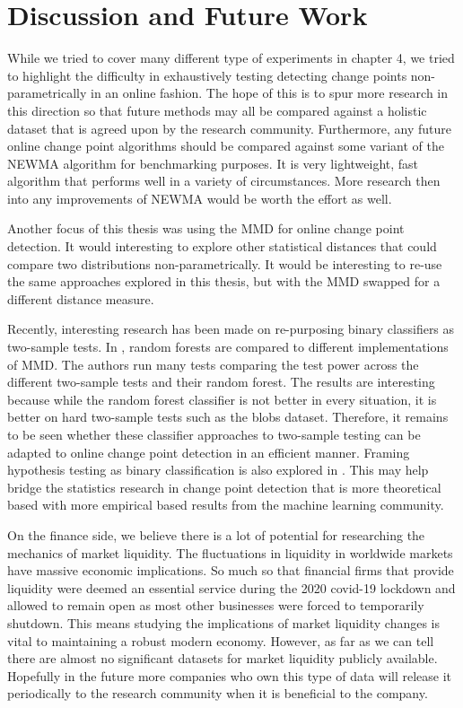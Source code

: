 \section{Discussion and Future Work}

While we tried to cover many different type of experiments in chapter 4, we tried to highlight the difficulty in exhaustively testing detecting change points non-parametrically in an online fashion. The hope of this is to spur more research in this direction so that future methods may all be compared against a holistic dataset that is agreed upon by the research community. Furthermore, any future online change point algorithms should be compared against some variant of the NEWMA algorithm for benchmarking purposes. It is very lightweight, fast algorithm that performs well in a variety of circumstances. More research then into any improvements of NEWMA would be worth the effort as well. 

Another focus of this thesis was using the MMD for online change point detection. It would interesting to explore other statistical distances that could compare two distributions non-parametrically. It would be interesting to re-use the same approaches explored in this thesis, but with the MMD swapped for a different distance measure. %

Recently, interesting research has been made on re-purposing binary classifiers as two-sample tests. In \cite{hediger2019use}, random forests are compared to different implementations of MMD. The authors run many tests comparing the test power across the different two-sample tests and their random forest. The results are interesting because while the random forest classifier is not better in every situation, it is better on hard two-sample tests such as the blobs dataset. Therefore, it remains to be seen whether these classifier approaches to two-sample testing can be adapted to online change point detection in an efficient manner. Framing hypothesis testing as binary classification is also explored in \cite{lopezrevisiting}. This may help bridge the statistics research in change point detection that is more theoretical based with more empirical based results from the machine learning community. 


On the finance side, we believe there is a lot of potential for researching the mechanics of market liquidity. The fluctuations in liquidity in worldwide markets have massive economic implications. So much so that financial firms that provide liquidity were deemed an essential service during the 2020 covid-19 lockdown and allowed to remain open as most other businesses were forced to temporarily shutdown. This means studying the implications of market liquidity changes is vital to maintaining a robust modern economy. However, as far as we can tell there are almost no significant datasets for market liquidity publicly available.  Hopefully in the future more companies who own this type of data will release it periodically to the research community when it is beneficial to the company. 